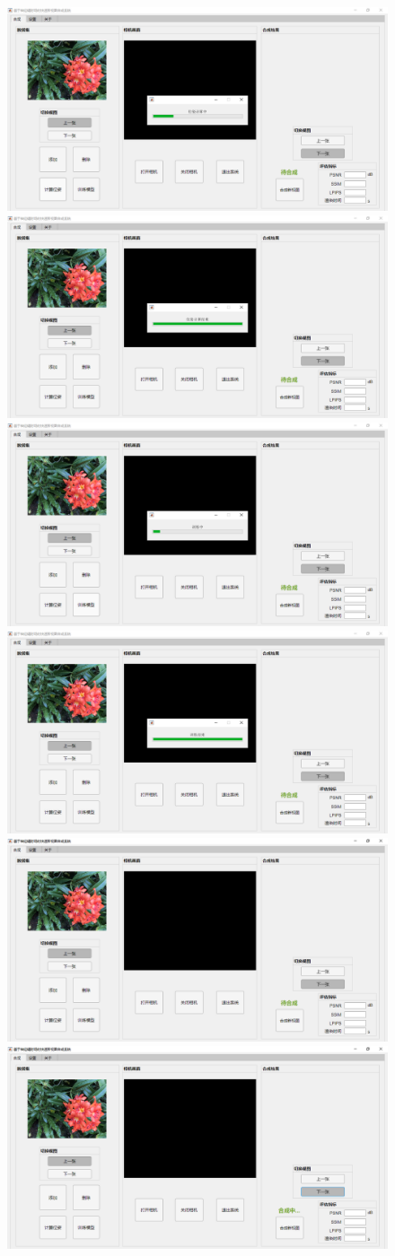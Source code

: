 \begin{figure}[bhtp]
  \centering
    {\includegraphics[width=0.45\linewidth]{figures/system/3-a.png}}
    {\includegraphics[width=0.45\linewidth]{figures/system/3-b.png}}
    {\includegraphics[width=0.45\linewidth]{figures/system/3-c.png}}
    {\includegraphics[width=0.45\linewidth]{figures/system/3-d.png}}
    {\includegraphics[width=0.45\linewidth]{figures/system/3-e.png}}
    {\includegraphics[width=0.45\linewidth]{figures/system/3-f.png}}

\end{figure}
